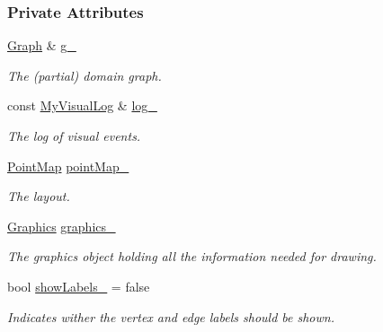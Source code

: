 \subsubsection*{Private Attributes}
\begin{DoxyCompactItemize}
\item 
\hyperlink{structDrawer_a2a65d4731ffb3bcf0102e830a831e575}{Graph} \& \hyperlink{structDrawer_a6f4114ac4de373e180c725eb7dfc7635}{g\+\_\+}\hypertarget{structDrawer_a6f4114ac4de373e180c725eb7dfc7635}{}\label{structDrawer_a6f4114ac4de373e180c725eb7dfc7635}

\begin{DoxyCompactList}\small\item\em The (partial) domain graph. \end{DoxyCompactList}\item 
const \hyperlink{structDrawer_a92e48b34c17108cc5a5a66ab84ad648b}{My\+Visual\+Log} \& \hyperlink{structDrawer_a4ccab3d9098d1967c077c872040e6bb7}{log\+\_\+}\hypertarget{structDrawer_a4ccab3d9098d1967c077c872040e6bb7}{}\label{structDrawer_a4ccab3d9098d1967c077c872040e6bb7}

\begin{DoxyCompactList}\small\item\em The log of visual events. \end{DoxyCompactList}\item 
\hyperlink{structDrawer_aab5295b2d9eedf3bab3cb4829cdcfb11}{Point\+Map} \hyperlink{structDrawer_ab1a5cc1a964c099bd30b5239d9188c99}{point\+Map\+\_\+}\hypertarget{structDrawer_ab1a5cc1a964c099bd30b5239d9188c99}{}\label{structDrawer_ab1a5cc1a964c099bd30b5239d9188c99}

\begin{DoxyCompactList}\small\item\em The layout. \end{DoxyCompactList}\item 
\hyperlink{structGraphics}{Graphics} \hyperlink{structDrawer_a88e3a5314d61b335029f6e8dea85e38d}{graphics\+\_\+}\hypertarget{structDrawer_a88e3a5314d61b335029f6e8dea85e38d}{}\label{structDrawer_a88e3a5314d61b335029f6e8dea85e38d}

\begin{DoxyCompactList}\small\item\em The graphics object holding all the information needed for drawing. \end{DoxyCompactList}\item 
bool \hyperlink{structDrawer_a9042fd2e9d4874e0ff4900ee8d97a6bf}{show\+Labels\+\_\+} = false\hypertarget{structDrawer_a9042fd2e9d4874e0ff4900ee8d97a6bf}{}\label{structDrawer_a9042fd2e9d4874e0ff4900ee8d97a6bf}

\begin{DoxyCompactList}\small\item\em Indicates wither the vertex and edge labels should be shown. \end{DoxyCompactList}\end{DoxyCompactItemize}


